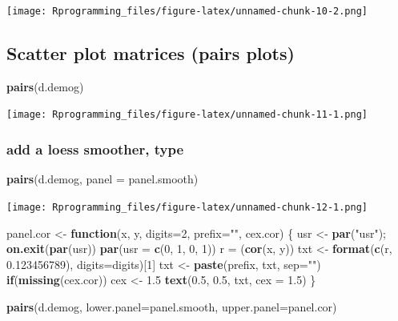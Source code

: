 \documentclass[10pt,]{krantz}
\makeatletter
\newenvironment{Shaded}{\begin{snugshade}}{\end{snugshade}}
\newcommand{\KeywordTok}[1]{\textcolor[rgb]{0.13,0.29,0.53}{\textbf{#1}}}
\newcommand{\DataTypeTok}[1]{\textcolor[rgb]{0.13,0.29,0.53}{#1}}
\newcommand{\DecValTok}[1]{\textcolor[rgb]{0.00,0.00,0.81}{#1}}
\newcommand{\FloatTok}[1]{\textcolor[rgb]{0.00,0.00,0.81}{#1}}
\newcommand{\StringTok}[1]{\textcolor[rgb]{0.31,0.60,0.02}{#1}}
\newcommand{\ControlFlowTok}[1]{\textcolor[rgb]{0.13,0.29,0.53}{\textbf{#1}}}
\newcommand{\NormalTok}[1]{#1}
\newenvironment{kframe}{%
\medskip{}
\setlength{\fboxsep}{.8em}
 \def\at@end@of@kframe{}%
 \ifinner\ifhmode%
  \def\at@end@of@kframe{\end{minipage}}%
  \begin{minipage}{\columnwidth}%
 \fi\fi%
 \def\FrameCommand##1{\hskip\@totalleftmargin \hskip-\fboxsep
 \colorbox{shadecolor}{##1}\hskip-\fboxsep
     \hskip-\linewidth \hskip-\@totalleftmargin \hskip\columnwidth}%
 \MakeFramed {\advance\hsize-\width
   \@totalleftmargin\z@ \linewidth\hsize
   \@setminipage}}%
 {\par\unskip\endMakeFramed%
 \at@end@of@kframe}
\renewenvironment{Shaded}{\begin{kframe}}{\end{kframe}}
\theoremstyle{definition}
\theoremstyle{definition}
\theoremstyle{remark}
\makeatother
\begin{document}
\texttt{[image: Rprogramming\_files/figure-latex/unnamed-chunk-10-2.png]}

\subsection{Scatter plot matrices (pairs
plots)}\label{scatter-plot-matrices-pairs-plots}

\begin{Shaded}
\begin{Highlighting}[]
\KeywordTok{pairs}\NormalTok{(d.demog)}
\end{Highlighting}
\end{Shaded}

\texttt{[image: Rprogramming\_files/figure-latex/unnamed-chunk-11-1.png]}

\subsubsection{add a loess smoother,
type}\label{add-a-loess-smoother-type}

\begin{Shaded}
\begin{Highlighting}[]
\KeywordTok{pairs}\NormalTok{(d.demog, }\DataTypeTok{panel =}\NormalTok{ panel.smooth)}
\end{Highlighting}
\end{Shaded}

\texttt{[image: Rprogramming\_files/figure-latex/unnamed-chunk-12-1.png]}

\begin{Shaded}
\begin{Highlighting}[]

\NormalTok{panel.cor <-}\StringTok{ }\ControlFlowTok{function}\NormalTok{(x, y, }\DataTypeTok{digits=}\DecValTok{2}\NormalTok{, }\DataTypeTok{prefix=}\StringTok{""}\NormalTok{, cex.cor)}
\NormalTok{\{}
\NormalTok{    usr <-}\StringTok{ }\KeywordTok{par}\NormalTok{(}\StringTok{"usr"}\NormalTok{); }\KeywordTok{on.exit}\NormalTok{(}\KeywordTok{par}\NormalTok{(usr))}
    \KeywordTok{par}\NormalTok{(}\DataTypeTok{usr =} \KeywordTok{c}\NormalTok{(}\DecValTok{0}\NormalTok{, }\DecValTok{1}\NormalTok{, }\DecValTok{0}\NormalTok{, }\DecValTok{1}\NormalTok{))}
\NormalTok{    r =}\StringTok{ }\NormalTok{(}\KeywordTok{cor}\NormalTok{(x, y))}
\NormalTok{    txt <-}\StringTok{ }\KeywordTok{format}\NormalTok{(}\KeywordTok{c}\NormalTok{(r, }\FloatTok{0.123456789}\NormalTok{), }\DataTypeTok{digits=}\NormalTok{digits)[}\DecValTok{1}\NormalTok{]}
\NormalTok{    txt <-}\StringTok{ }\KeywordTok{paste}\NormalTok{(prefix, txt, }\DataTypeTok{sep=}\StringTok{""}\NormalTok{)}
    \ControlFlowTok{if}\NormalTok{(}\KeywordTok{missing}\NormalTok{(cex.cor)) cex <-}\StringTok{ }\FloatTok{1.5}
    \KeywordTok{text}\NormalTok{(}\FloatTok{0.5}\NormalTok{, }\FloatTok{0.5}\NormalTok{, txt, }\DataTypeTok{cex =} \FloatTok{1.5}\NormalTok{)}
\NormalTok{\}}

\KeywordTok{pairs}\NormalTok{(d.demog, }\DataTypeTok{lower.panel=}\NormalTok{panel.smooth, }\DataTypeTok{upper.panel=}\NormalTok{panel.cor) }
\end{Highlighting}
\end{Shaded}
\end{document}
